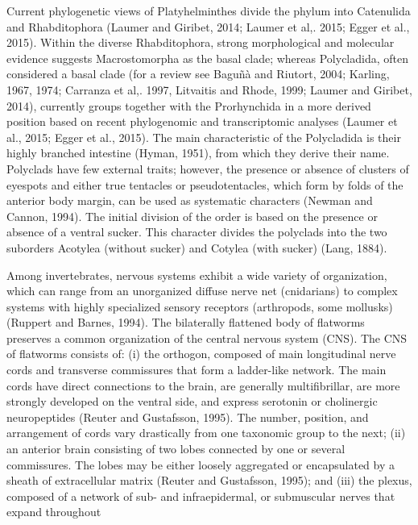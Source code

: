 \begin{multicols}{2}
\par{}Current phylogenetic views of Platyhelminthes divide the phylum into Catenulida and Rhabditophora (Laumer and Giribet, 2014; Laumer et al,. 2015; Egger et al.,
2015). Within the diverse Rhabditophora, strong morphological and molecular evidence suggests Macrostomorpha
as the basal clade; whereas Polycladida, often considered a
basal clade (for a review see Baguñà and Riutort, 2004;
Karling, 1967, 1974; Carranza et al,. 1997, Litvaitis and
Rhode, 1999; Laumer and Giribet, 2014), currently groups
together with the Prorhynchida in a more derived position
based on recent phylogenomic and transcriptomic analyses (Laumer et al., 2015; Egger et al., 2015). The main characteristic of the Polycladida is their highly branched intestine
(Hyman, 1951), from which they derive their name. Polyclads have few external traits; however, the presence or absence of clusters of eyespots and either true tentacles or
pseudotentacles, which form by folds of the anterior body
margin, can be used as systematic characters (Newman and
Cannon, 1994). The initial division of the order is based on
the presence or absence of a ventral sucker. This character
divides the polyclads into the two suborders Acotylea
(without sucker) and Cotylea (with sucker) (Lang, 1884).
\par{}Among invertebrates, nervous systems exhibit a wide
variety of organization, which can range from an unorganized diffuse nerve net (cnidarians) to complex systems
with highly specialized sensory receptors (arthropods,
some mollusks) (Ruppert and Barnes, 1994). The bilaterally flattened body of flatworms preserves a common organization of the central nervous system (CNS). The CNS of
flatworms consists of: (i) the orthogon, composed of main
longitudinal nerve cords and transverse commissures that
form a ladder-like network. The main cords have direct
connections to the brain, are generally multifibrillar, are
more strongly developed on the ventral side, and express
serotonin or cholinergic neuropeptides (Reuter and Gustafsson, 1995). The number, position, and arrangement of
cords vary drastically from one taxonomic group to the
next; (ii) an anterior brain consisting of two lobes connected by one or several commissures. The lobes may be either loosely aggregated or encapsulated by a sheath of
extracellular matrix (Reuter and Gustafsson, 1995); and
(iii) the plexus, composed of a network of sub- and infraepidermal, or submuscular nerves that expand throughout

\end{multicols}
